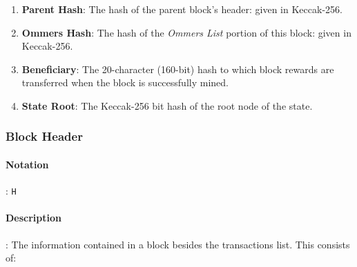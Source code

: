 \documentclass[10pt,a4paper,leqno,bibliography=totoc]{scrartcl}
\newenvironment{alphafootnotes}
{\par\edef\savedfootnotenumber{\number\value{footnote}}
\renewcommand{\thefootnote}{\alph{footnote}}
\setcounter{footnote}{0}}
{\par\setcounter{footnote}{\savedfootnotenumber}}
\begin{document}
\begin{alphafootnotes}
\begin{multicols*}{2}
			\begin{enumerate}
				\item \textbf{Parent Hash}: The hash of the parent block's header: given in Keccak-256.
				\item \textbf{Ommers Hash}: The hash of the \textsl{Ommers List} portion of this block: given in Keccak-256.
				\item \textbf{Beneficiary}: The 20-character (160-bit) hash to which block rewards are transferred when the block is successfully mined.
				\item \textbf{State Root}: The Keccak-256 bit hash of the root node of the state. 
			
			\end{enumerate}
				\subsubsection{Block Header}
				\paragraph{Notation}: \texttt{H} 
				\paragraph{Description}: The information contained in a block besides the transactions list. This consists of:


\end{multicols*}
\end{alphafootnotes}
\end{document}
